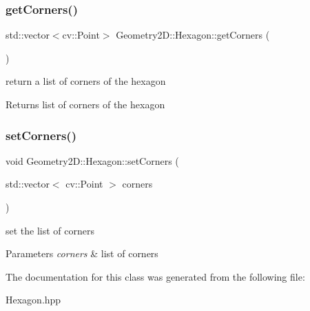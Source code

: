 \subsubsection{\texorpdfstring{get\+Corners()}{getCorners()}}
{\footnotesize\ttfamily std\+::vector$<$cv\+::\+Point$>$ Geometry2\+D\+::\+Hexagon\+::get\+Corners (\begin{DoxyParamCaption}{ }\end{DoxyParamCaption})}

return a list of corners of the hexagon \begin{DoxyReturn}{Returns}
list of corners of the hexagon 
\end{DoxyReturn}
\mbox{\label{class_geometry2_d_1_1_hexagon_ab1557df2a9a0092e5cc23ff32f5f25bc}} 
\subsubsection{\texorpdfstring{set\+Corners()}{setCorners()}}
{\footnotesize\ttfamily void Geometry2\+D\+::\+Hexagon\+::set\+Corners (\begin{DoxyParamCaption}\item[{std\+::vector$<$ cv\+::\+Point $>$}]{corners }\end{DoxyParamCaption})}

set the list of corners 
\begin{DoxyParams}{Parameters}
{\em corners} & list of corners \\
\hline
\end{DoxyParams}


The documentation for this class was generated from the following file\+:\begin{DoxyCompactItemize}
\item 
Hexagon.\+hpp\end{DoxyCompactItemize}
